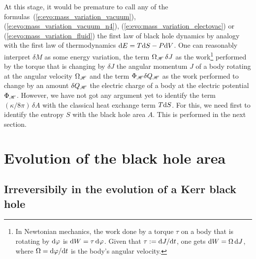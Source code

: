 At this stage, it would be premature to call any of the formulas~(\ref{e:evo:mass_variation_vacuum}),
(\ref{e:evo:mass_variation_vacuum_n4}), (\ref{e:evo:mass_variation_electovac})
or (\ref{e:evo:mass_variation_fluid})
the first law of black hole dynamics by analogy with the first law of thermodynamics
$\mathrm{d} E = T \mathrm{d} S - P \mathrm{d} V$. One can reasonably interpret $\delta M$
as some energy variation, the term
$\Omega_{\mathscr{H}} \, \delta J$ as the work\footnote{In Newtonian mechanics, the
work done by a torque $\tau$ on a body that is rotating by $\mathrm{d}\varphi$
is $\mathrm{d} W = \tau \, \mathrm{d}\varphi$. Given that $\tau := \mathrm{d} J/\mathrm{d} t$, one gets $\mathrm{d} W = \Omega \, \mathrm{d} J$, where
$\Omega = \mathrm{d}\varphi/\mathrm{d} t$ is the body's angular velocity.} performed by the torque
that is changing by $\delta J$ the angular momentum $J$ of a body rotating
at the angular velocity $\Omega_{\mathscr{H}}$ and the term $\Phi_{\mathscr{H}} \delta Q_{\mathscr{H}}$
as the work performed to change by an amount $\delta Q_{\mathscr{H}}$ the electric charge
of a body at the electric potential $\Phi_{\mathscr{H}}$.
However, we have not got any argument yet
to identify the term $(\kappa/8\pi) \, \delta A$ with the classical heat exchange term $T\mathrm{d} S$.
For this, we need first to identify the entropy $S$ with the black hole area $A$.
This is performed in the next section.



\section{Evolution of the black hole area} \label{s:evo:evol_area}

\subsection{Irreversibily in the evolution of a Kerr black hole} \label{s:evo:irreversible_mass}

